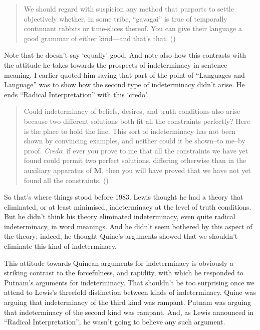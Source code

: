 \documentclass[
  10pt,
  letterpaper,
  DIV=11,
  numbers=noendperiod,
  twoside]{scrartcl}
\begin{document}
\begin{quote}
We should regard with suspicion any method that purports to settle
objectively whether, in some tribe, ``gavagai'' is true of temporally
continuant rabbits or time-slices thereof. You can give their language a
good grammar of either kind---and that's that.
()
\end{quote}

Note that he doesn't say `equally' good. And note also how this
contrasts with the attitude he takes towards the prospects of
indeterminacy in sentence meaning. I earlier quoted him saying that part
of the point of ``Languages and Language'' was to show how the second
type of indeterminacy didn't arise. He ends ``Radical Interpretation''
with this `credo'.

\begin{quote}
Could indeterminacy of beliefs, desires, and truth conditions also arise
because two different solutions both fit all the constraints perfectly?
Here is the place to hold the line. This sort of indeterminacy has not
been shown by convincing examples, and neither could it be shown--to
me--by proof. \emph{Credo}: if ever you prove to me that all the
constraints we have yet found could permit two perfect solutions,
differing otherwise than in the auxiliary apparatus of \textbf{M}, then
you will have proved that we have not yet found all the constraints.
()
\end{quote}

So that's where things stood before 1983. Lewis thought he had a theory
that eliminated, or at least minimised, indeterminacy at the level of
truth conditions. But he didn't think his theory eliminated
indeterminacy, even quite radical indeterminacy, in word meanings. And
he didn't seem bothered by this aspect of the theory; indeed, he thought
Quine's arguments showed that we shouldn't eliminate this kind of
indeterminacy.

This attitude towards Quinean arguments for indeterminacy is obviously a
striking contrast to the forcefulness, and rapidity, with which he
responded to Putnam's arguments for indeterminacy. That shouldn't be too
surprising once we attend to Lewis's threefold distinction between kinds
of indeterminacy. Quine was arguing that indeterminacy of the third kind
was rampant. Putnam was arguing that indeterminacy of the second kind
was rampant. And, as Lewis announced in ``Radical Interpretation'', he
wasn't going to believe any such argument.
\end{document}
